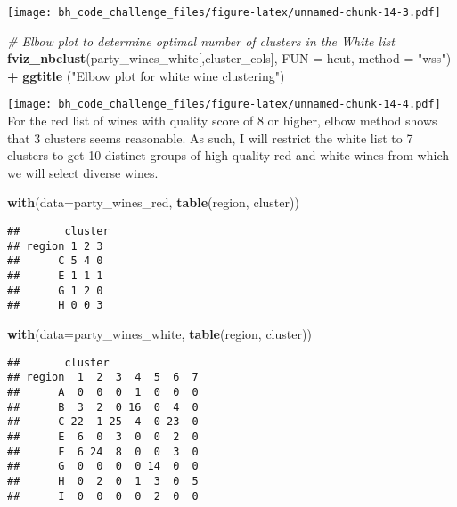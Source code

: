 \documentclass[
]{article}
\newenvironment{Shaded}{\begin{snugshade}}{\end{snugshade}}
\newcommand{\CommentTok}[1]{\textcolor[rgb]{0.56,0.35,0.01}{\textit{#1}}}
\newcommand{\DataTypeTok}[1]{\textcolor[rgb]{0.13,0.29,0.53}{#1}}
\newcommand{\KeywordTok}[1]{\textcolor[rgb]{0.13,0.29,0.53}{\textbf{#1}}}
\newcommand{\NormalTok}[1]{#1}
\newcommand{\OperatorTok}[1]{\textcolor[rgb]{0.81,0.36,0.00}{\textbf{#1}}}
\newcommand{\StringTok}[1]{\textcolor[rgb]{0.31,0.60,0.02}{#1}}
\begin{document}
\texttt{[image: bh\_code\_challenge\_files/figure-latex/unnamed-chunk-14-3.pdf]}

\begin{Shaded}
\begin{Highlighting}[]
\CommentTok{# Elbow plot to determine optimal number of clusters in the White list}
\KeywordTok{fviz_nbclust}\NormalTok{(party_wines_white[,cluster_cols], }\DataTypeTok{FUN =}\NormalTok{ hcut, }\DataTypeTok{method =} \StringTok{"wss"}\NormalTok{) }\OperatorTok{+}
\StringTok{  }\KeywordTok{ggtitle}\NormalTok{ (}\StringTok{"Elbow plot for white wine clustering"}\NormalTok{)}
\end{Highlighting}
\end{Shaded}

\texttt{[image: bh\_code\_challenge\_files/figure-latex/unnamed-chunk-14-4.pdf]}
For the red list of wines with quality score of 8 or higher, elbow
method shows that 3 clusters seems reasonable. As such, I will restrict
the white list to 7 clusters to get 10 distinct groups of high quality
red and white wines from which we will select diverse wines.

\begin{Shaded}
\begin{Highlighting}[]
\KeywordTok{with}\NormalTok{(}\DataTypeTok{data=}\NormalTok{party_wines_red, }\KeywordTok{table}\NormalTok{(region, cluster))}
\end{Highlighting}
\end{Shaded}

\begin{verbatim}
##       cluster
## region 1 2 3
##      C 5 4 0
##      E 1 1 1
##      G 1 2 0
##      H 0 0 3
\end{verbatim}

\begin{Shaded}
\begin{Highlighting}[]
\KeywordTok{with}\NormalTok{(}\DataTypeTok{data=}\NormalTok{party_wines_white, }\KeywordTok{table}\NormalTok{(region, cluster))}
\end{Highlighting}
\end{Shaded}

\begin{verbatim}
##       cluster
## region  1  2  3  4  5  6  7
##      A  0  0  0  1  0  0  0
##      B  3  2  0 16  0  4  0
##      C 22  1 25  4  0 23  0
##      E  6  0  3  0  0  2  0
##      F  6 24  8  0  0  3  0
##      G  0  0  0  0 14  0  0
##      H  0  2  0  1  3  0  5
##      I  0  0  0  0  2  0  0
\end{verbatim}
\end{document}
